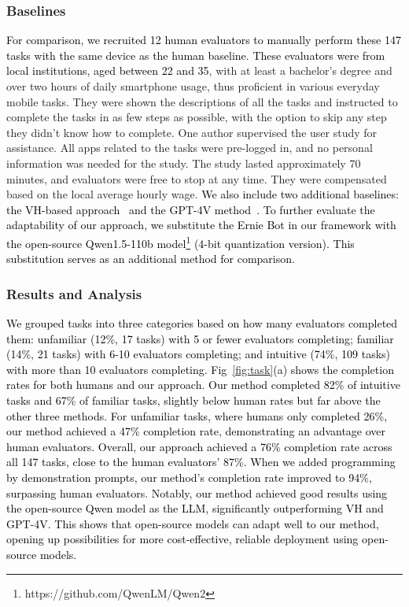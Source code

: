 \subsubsection{Baselines}
\textcolor{black}{For comparison, we recruited 12 human evaluators to manually perform these 147 tasks with the same device as the human baseline. These evaluators were from local institutions, aged between 22 and 35}, with at least a bachelor's degree and over two hours of daily smartphone usage, thus proficient in various everyday mobile tasks. They were shown the descriptions of all the tasks and instructed to complete the tasks in as few steps as possible, with the option to skip any step they didn't know how to complete. One author supervised the user study for assistance. All apps related to the tasks were pre-logged in, and no personal information was needed for the study. The study lasted approximately 70 minutes, and evaluators were free to stop at any time. They were compensated based on the local average hourly wage. \textcolor{black}{We also include two additional baselines: the VH-based approach~\cite{wang2023enabling} and the GPT-4V method~\cite{yan2023gpt}. To further evaluate the adaptability of our approach, we substitute the Ernie Bot in our framework with the open-source Qwen1.5-110b model\footnote{https://github.com/QwenLM/Qwen2} (4-bit quantization version). This substitution serves as an additional method for comparison.}

\subsubsection{Results and Analysis}
\textcolor{black}{We grouped tasks into three categories based on how many evaluators completed them: unfamiliar (12\%, 17 tasks) with 5 or fewer evaluators completing; familiar (14\%, 21 tasks) with 6-10 evaluators completing; and intuitive (74\%, 109 tasks) with more than 10 evaluators completing. Fig~\ref{fig:task}(a) shows the completion rates for both humans and our approach. Our method completed 82\% of intuitive tasks and 67\% of familiar tasks, slightly below human rates but far above the other three methods. For unfamiliar tasks, where humans only completed 26\%, our method achieved a 47\% completion rate, demonstrating an advantage over human evaluators. Overall, our approach achieved a 76\% completion rate across all 147 tasks, close to the human evaluators' 87\%. When we added programming by demonstration prompts, our method's completion rate improved to 94\%, surpassing human evaluators. Notably, our method achieved good results using the open-source Qwen model as the LLM, significantly outperforming VH and GPT-4V. This shows that open-source models can adapt well to our method, opening up possibilities for more cost-effective, reliable deployment using open-source models.}

